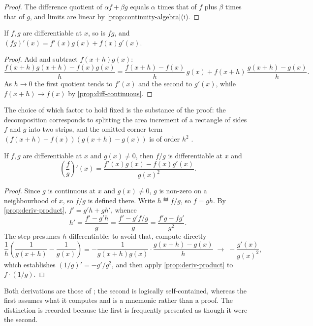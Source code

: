 \begin{proof}
	The difference quotient of $\alpha f+\beta g$ equals
	$\alpha$ times that of $f$ plus $\beta$ times that of $g$, and limits are linear
	by \autoref{prop:continuity-algebra}(i).
\end{proof}

\begin{proposition}\label{prop:deriv-product}
	If $f,g$ are differentiable at $x$, so is $fg$, and
	$(fg)'(x)=f'(x)g(x)+f(x)g'(x)$.
\end{proposition}

\begin{proof}
	Add and subtract $f(x+h)g(x)$:
	\[
		\frac{f(x+h)g(x+h)-f(x)g(x)}{h}
		=\frac{f(x+h)-f(x)}{h}\,g(x)+f(x+h)\,\frac{g(x+h)-g(x)}{h}.
	\]
	As $h\to0$ the first quotient tends to $f'(x)$ and the second to $g'(x)$, while
	$f(x+h)\to f(x)$ by \autoref{prop:diff-continuous}.
\end{proof}

The choice of which factor to hold fixed is the substance of the proof: the
decomposition corresponds to splitting the area increment of a rectangle of sides
$f$ and $g$ into two strips, and the omitted corner term
$(f(x+h)-f(x))(g(x+h)-g(x))$ is of order $h^2$
\autocite[slide 11]{fukuda2026calculus}.

\begin{proposition}\label{prop:deriv-quotient}
	If $f,g$ are differentiable at $x$ and $g(x)\neq0$, then $f/g$ is
	differentiable at $x$ and
	\[
		\left(\frac{f}{g}\right)'(x)=\frac{f'(x)g(x)-f(x)g'(x)}{g(x)^2}.
	\]
\end{proposition}

\begin{proof}
	Since $g$ is continuous at $x$ and $g(x)\neq0$, $g$ is non-zero on a
	neighbourhood of $x$, so $f/g$ is defined there. Write $h\eqdef f/g$, so
	$f=gh$. By \autoref{prop:deriv-product}, $f'=g'h+gh'$, whence
	\[
		h'=\frac{f'-g'h}{g}=\frac{f'-g'f/g}{g}=\frac{f'g-fg'}{g^2}.
	\]
	The step presumes $h$ differentiable; to avoid that, compute directly
	\[
		\frac{1}{h}\left(\frac{1}{g(x+h)}-\frac{1}{g(x)}\right)
		=-\frac{1}{g(x+h)g(x)}\cdot\frac{g(x+h)-g(x)}{h}
		\;\longrightarrow\;-\frac{g'(x)}{g(x)^2},
	\]
	which establishes $(1/g)'=-g'/g^2$, and then apply
	\autoref{prop:deriv-product} to $f\cdot(1/g)$.
\end{proof}

Both derivations are those of \autocite[slides 13--14, 16]{fukuda2026calculus};
the second is logically self-contained, whereas the first assumes what it
computes and is a mnemonic rather than a proof. The distinction is recorded
because the first is frequently presented as though it were the second.

